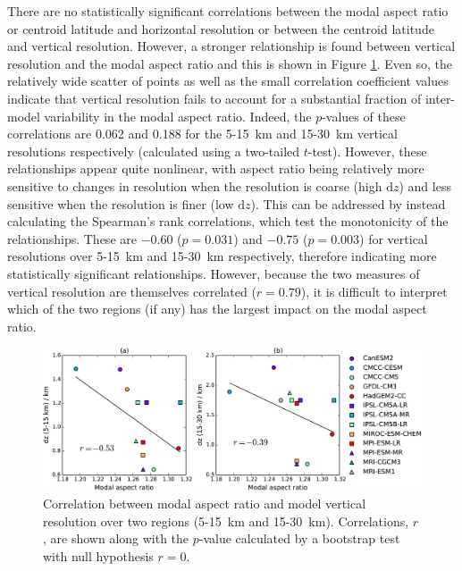 There are no statistically significant correlations between the modal aspect
ratio or centroid latitude and horizontal resolution or between the centroid
latitude and vertical resolution. However, a stronger relationship is found
between vertical resolution and the modal aspect ratio and this is shown in
Figure \ref{fig:aspect_vert_res}. Even so, the relatively wide scatter of points
as well as the small correlation coefficient values indicate that vertical
resolution fails to account for a substantial fraction of inter-model
variability in the modal aspect ratio. Indeed, the $p$-values of these
correlations are 0.062 and 0.188 for the 5-15~km and 15-30~km vertical
resolutions respectively (calculated using a two-tailed $t$-test). However,
these relationships appear quite nonlinear, with aspect ratio being relatively
more sensitive to changes in resolution when the resolution is coarse (high
$\mathrm{d}z$) and less sensitive when the resolution is finer (low
$\mathrm{d}z$). This can be addressed by instead calculating the Spearman's rank
correlations, which test the monotonicity of the relationships. These are
$-0.60$ ($p=0.031$) and $-0.75$ ($p=0.003$) for vertical resolutions over
5-15~km and 15-30~km respectively, therefore indicating more statistically
significant relationships. However, because the two measures of vertical
resolution are themselves correlated ($r=0.79$), it is difficult to interpret
which of the two regions (if any) has the largest impact on the modal aspect
ratio.

\begin{figure}
 \centering
 \noindent\includegraphics[width=\textwidth]{figures/chapter-models/aspect_ratio_resolution.pdf}
 \caption[Vertical resolution and modal aspect ratio.]{Correlation between modal aspect ratio and
   model vertical resolution over two regions (5-15~km and
   15-30~km). Correlations, $r$, are shown along with the $p$-value calculated by a
   bootstrap test with null hypothesis $r=0$.}
 \label{fig:aspect_vert_res}
\end{figure}

